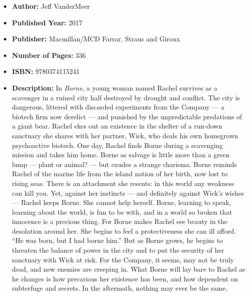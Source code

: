 \documentclass{tufte-handout}
\begin{document}
\begin{itemize}
    \item[] \textbf{Author:} Jeff VanderMeer
    \item[] \textbf{Published Year:} 2017
    \item[] \textbf{Publisher:} Macmillan/MCD Farrar, Straus and Giroux
    \item[] \textbf{Number of Pages:} 336      
    \item[] \textbf{ISBN:} 9780374115241
    \item[] \textbf{Description:} In \textit{Borne}, a young woman named Rachel survives as a scavenger in a ruined city half destroyed by drought and conflict. The city is dangerous, littered with discarded experiments from the Company --- a biotech firm now derelict --- and punished by the unpredictable predations of a giant bear. Rachel ekes out an existence in the shelter of a run-down sanctuary she shares with her partner, Wick, who deals his own homegrown psychoactive biotech. One day, Rachel finds Borne during a scavenging mission and takes him home. Borne as salvage is little more than a green lump --- plant or animal? --- but exudes a strange charisma. Borne reminds Rachel of the marine life from the island nation of her birth, now lost to rising seas. There is an attachment she resents: in this world any weakness can kill you. Yet, against her instincts --- and definitely against Wick’s wishes --- Rachel keeps Borne. She cannot help herself. Borne, learning to speak, learning about the world, is fun to be with, and in a world so broken that innocence is a precious thing. For Borne makes Rachel see beauty in the desolation around her. She begins to feel a protectiveness she can ill afford. ``He was born, but I had borne him.'' But as Borne grows, he begins to threaten the balance of power in the city and to put the security of her sanctuary with Wick at risk. For the Company, it seems, may not be truly dead, and new enemies are creeping in. What Borne will lay bare to Rachel as he changes is how precarious her existence has been, and how dependent on subterfuge and secrets. In the aftermath, nothing may ever be the same.

\end{itemize}
\end{document}

